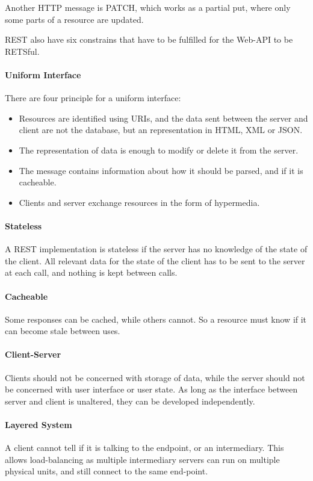 Another HTTP message is PATCH, which works as a partial put, where only some parts of a resource are updated.

REST also have six constrains that have to be fulfilled for the Web-API to be RETSful.

\paragraph{Uniform Interface}  There are four principle for a uniform interface:
\begin{itemize}
\item Resources are identified using URIs, and the data sent between the server and client are not the database, but an representation in HTML, XML or JSON.
\item The representation of data is enough to modify or delete it from the server.
\item The message contains information about how it should be parsed, and if it is cacheable.
\item Clients and server exchange resources in the form of hypermedia.
\end{itemize}
\paragraph{Stateless} A REST implementation is stateless if the server has no knowledge of the state of the client. All relevant data for the state of the client has to be sent to the server at each call, and nothing is kept between calls.
\paragraph{Cacheable} Some responses can be cached, while others cannot. So a resource must know if it can become stale between uses.
\paragraph{Client-Server} Clients should not be concerned with storage of data, while the server should not be concerned with user interface or user state. As long as the interface between server and client is unaltered, they can be developed independently.
\paragraph{Layered System} A client cannot tell if it is talking to the endpoint, or an intermediary. This allows load-balancing as multiple intermediary servers can run on multiple physical units, and still connect to the same end-point.
